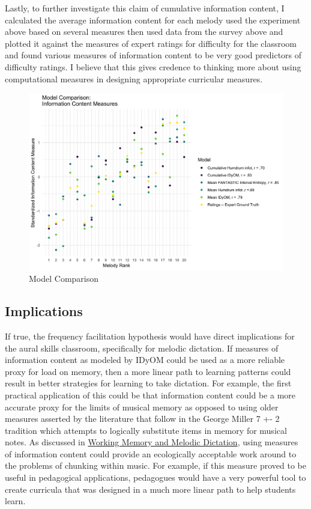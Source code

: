 \documentclass[]{book}
\begin{document}
Lastly, to further investigate this claim of cumulative information content, I calculated the average information content for each melody used the experiment above based on several measures then used data from the survey above and plotted it against the measures of expert ratings for difficulty for the classroom and found various measures of information content to be very good predictors of difficulty ratings.
I believe that this gives credence to thinking more about using computational measures in designing appropriate curricular measures.

\begin{figure}

{\centering \includegraphics[width=1\linewidth]{img/model_comparsion_gg} 

}

\caption{Model Comparison}\label{fig:modelcomparsion}
\end{figure}

\hypertarget{implications}{%
\subsection{Implications}\label{implications}}

If true, the frequency facilitation hypothesis would have direct implications for the aural skills classroom, specifically for melodic dictation.
If measures of information content as modeled by IDyOM could be used as a more reliable proxy for load on memory, then a more linear path to learning patterns could result in better strategies for learning to take dictation.
For example, the first practical application of this could be that information content could be a more accurate proxy for the limits of musical memory as opposed to using older measures asserted by the literature that follow in the George Miller 7 +- 2 tradition which attempts to logically substitute items in memory for musical notes.
As discussed in \protect\hyperlink{working-memory-and-melodic-dictation}{Working Memory and Melodic Dictation}, using measures of information content could provide an ecologically acceptable work around to the problems of chunking within music.
For example, if this measure proved to be useful in pedagogical applications, pedagogues would have a very powerful tool to create curricula that was designed in a much more linear path to help students learn.
\end{document}
